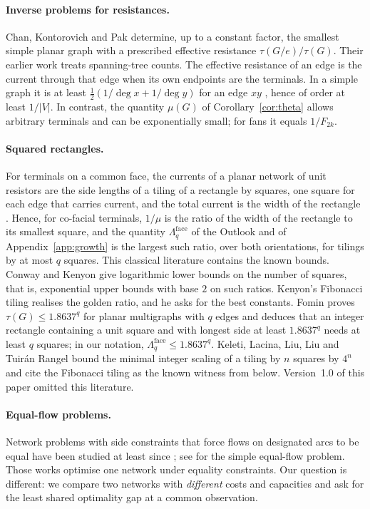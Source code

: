 \documentclass[11pt]{amsart}
\theoremstyle{plain}
\theoremstyle{definition}
\theoremstyle{remark}
\begin{document}
\paragraph{Inverse problems for resistances.} Chan, Kontorovich and Pak \cite{CKP25} determine, up to a constant
factor, the smallest simple planar graph with a prescribed effective resistance $\tau(G/e)/\tau(G)$. Their earlier
work \cite{CKP24} treats spanning-tree counts. The effective resistance of an edge is the current through that edge
when its own endpoints are the terminals. In a simple graph it is at least
$\tfrac12(1/\deg x+1/\deg y)$ for an edge $xy$ \cite[Lemma~3.4]{CKP25}, hence of order at least $1/|V|$. In contrast, the quantity $\mu(G)$ of Corollary~\ref{cor:theta} allows arbitrary terminals
and can be exponentially small; for fans it equals $1/F_{2k}$.

\paragraph{Squared rectangles.} For terminals on a common face, the currents of a planar network of unit resistors
are the side lengths of a tiling of a rectangle by squares, one square for each edge that carries current, and the
total current is the width of the rectangle \cite{BSST}. Hence, for co-facial terminals, $1/\mu$ is the ratio of
the width of the rectangle to its smallest square, and the quantity $\Lambda^{\mathrm{face}}_q$ of the Outlook and
of Appendix~\ref{app:growth} is the largest such ratio, over both orientations, for tilings by at most $q$ squares.
This classical literature contains the known bounds. Conway \cite{Conway} and Kenyon \cite{Kenyon} give
logarithmic lower bounds on the number of squares, that is, exponential upper bounds with base $2$ on such
ratios. Kenyon's Fibonacci tiling realises the golden ratio, and he asks for the best constants. Fomin \cite{Fomin}
proves $\tau(G)\le1.8637^q$ for planar multigraphs with $q$ edges and deduces that an integer rectangle containing
a unit square and with longest side at least $1.8637^q$ needs at least $q$ squares; in our notation,
$\Lambda^{\mathrm{face}}_q\le1.8637^q$. Keleti, Lacina, Liu, Liu and Tuir\'an Rangel \cite{Keleti} bound the
minimal integer scaling of a tiling by $n$ squares by $4^n$ and cite the Fibonacci tiling as the known witness from
below. Version~1.0 of this paper omitted this literature.

\paragraph{Equal-flow problems.} Network problems with side constraints that force flows on designated arcs to be
equal have been studied at least since \cite{AliKenningtonShetty}; see \cite{AhujaOrlinSechiZuddas} for the simple
equal-flow problem. Those works optimise one network under equality constraints. Our question is different: we
compare two networks with \emph{different} costs and capacities and ask for the least shared optimality gap at a
common observation.
\end{document}
